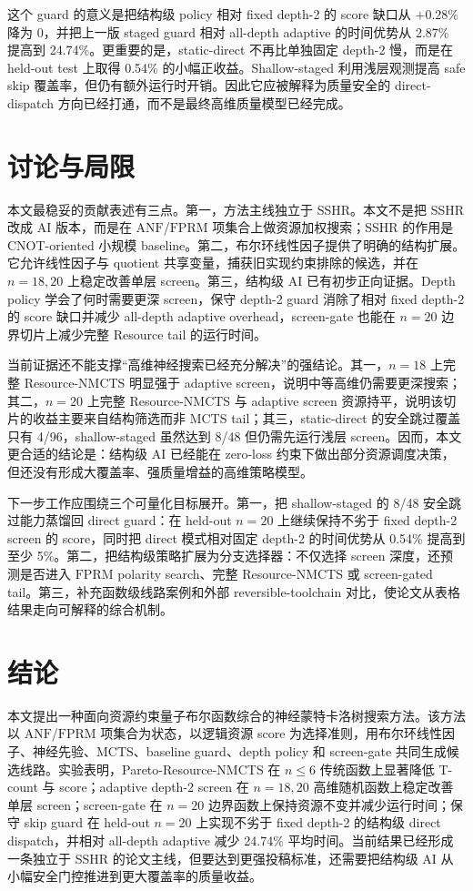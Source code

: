 \documentclass[UTF8,fontset=macnew,11pt]{ctexart}
\newcommand{\method}{Resource-NMCTS}
\newcommand{\pareto}{Pareto-Resource-NMCTS}
\newcommand{\anf}{\ensuremath{\mathrm{ANF}}}
\newcommand{\fprm}{\ensuremath{\mathrm{FPRM}}}
\newcommand{\mcts}{\ensuremath{\mathrm{MCTS}}}
\begin{document}
这个 guard 的意义是把结构级 policy 相对 fixed depth-2 的 score 缺口从 $+0.28\%$ 降为 $0$，并把上一版 staged guard 相对 all-depth adaptive 的时间优势从 2.87\% 提高到 24.74\%。更重要的是，static-direct 不再比单独固定 depth-2 慢，而是在 held-out test 上取得 0.54\% 的小幅正收益。Shallow-staged 利用浅层观测提高 safe skip 覆盖率，但仍有额外运行时开销。因此它应被解释为质量安全的 direct-dispatch 方向已经打通，而不是最终高维质量模型已经完成。

\section{讨论与局限}

本文最稳妥的贡献表述有三点。第一，方法主线独立于 SSHR。本文不是把 SSHR 改成 AI 版本，而是在 \anf{}/\fprm{} 项集合上做资源加权搜索；SSHR 的作用是 CNOT-oriented 小规模 baseline。第二，布尔环线性因子提供了明确的结构扩展。它允许线性因子与 quotient 共享变量，捕获旧实现约束排除的候选，并在 $n=18,20$ 上稳定改善单层 screen。第三，结构级 AI 已有初步正向证据。Depth policy 学会了何时需要更深 screen，保守 depth-2 guard 消除了相对 fixed depth-2 的 score 缺口并减少 all-depth adaptive overhead，screen-gate 也能在 $n=20$ 边界切片上减少完整 Resource tail 的运行时间。

当前证据还不能支撑“高维神经搜索已经充分解决”的强结论。其一，$n=18$ 上完整 \method{} 明显强于 adaptive screen，说明中等高维仍需要更深搜索；其二，$n=20$ 上完整 \method{} 与 adaptive screen 资源持平，说明该切片的收益主要来自结构筛选而非 MCTS tail；其三，static-direct 的安全跳过覆盖只有 4/96，shallow-staged 虽然达到 8/48 但仍需先运行浅层 screen。因而，本文更合适的结论是：结构级 AI 已经能在 zero-loss 约束下做出部分资源调度决策，但还没有形成大覆盖率、强质量增益的高维策略模型。

下一步工作应围绕三个可量化目标展开。第一，把 shallow-staged 的 8/48 安全跳过能力蒸馏回 direct guard：在 held-out $n=20$ 上继续保持不劣于 fixed depth-2 screen 的 score，同时把 direct 模式相对固定 depth-2 的时间优势从 0.54\% 提高到至少 5\%。第二，把结构级策略扩展为分支选择器：不仅选择 screen 深度，还预测是否进入 \fprm{} polarity search、完整 \method{} 或 screen-gated tail。第三，补充函数级线路案例和外部 reversible-toolchain 对比，使论文从表格结果走向可解释的综合机制。

\section{结论}

本文提出一种面向资源约束量子布尔函数综合的神经蒙特卡洛树搜索方法。该方法以 \anf{}/\fprm{} 项集合为状态，以逻辑资源 score 为选择准则，用布尔环线性因子、神经先验、\mcts{}、baseline guard、depth policy 和 screen-gate 共同生成候选线路。实验表明，\pareto{} 在 $n\leq6$ 传统函数上显著降低 T-count 与 score；adaptive depth-2 screen 在 $n=18,20$ 高维随机函数上稳定改善单层 screen；screen-gate 在 $n=20$ 边界函数上保持资源不变并减少运行时间；保守 skip guard 在 held-out $n=20$ 上实现不劣于 fixed depth-2 的结构级 direct dispatch，并相对 all-depth adaptive 减少 24.74\% 平均时间。当前结果已经形成一条独立于 SSHR 的论文主线，但要达到更强投稿标准，还需要把结构级 AI 从小幅安全门控推进到更大覆盖率的质量收益。
\end{document}
